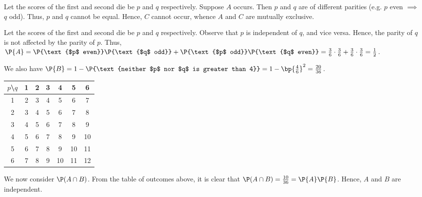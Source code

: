\begin{solution}
    \begin{ppart}
        Let the scores of the first and second die be $p$ and $q$ respectively. Suppose $A$ occurs. Then $p$ and $q$ are of different parities (e.g. $p$ even $\implies$ $q$ odd). Thus, $p$ and $q$ cannot be equal. Hence, $C$ cannot occur, whence $A$ and $C$ are mutually exclusive.
    \end{ppart}
    \begin{ppart}
        Let the scores of the first and second die be $p$ and $q$ respectively. Observe that $p$ is independent of $q$, and vice versa. Hence, the parity of $q$ is not affected by the parity of $p$. Thus, $\P{A} = \P{\text{$p$ even}}\P{\text{$q$ odd}} + \P{\text{$p$ odd}}\P{\text{$q$ even}} = \frac36 \cdot \frac36 + \frac36 \cdot \frac36 = \frac12$.

        We also have $\P{B} = 1 - \P{\text{neither $p$ nor $q$ is greater than 4}} = 1 - \bp{\frac46}^2 = \frac{20}{36}$.

        \begin{center}
            \begin{tabular}{|c|c|c|c|c|c|c|}
                \hline $p$\textbackslash$q$ & 1 & 2 & 3 & 4 & 5 & 6\\\hline
                1 & 2 & 3 & 4 & 5 & 6 & \cellcolor{blue!25}7 \\ \hline
                2 & 3 & 4 & 5 & 6 & \cellcolor{blue!25}7 & 8 \\ \hline
                3 & 4 & 5 & 6 & 7 & 8 & \cellcolor{blue!25}9 \\ \hline
                4 & 5 & 6 & 7 & 8 & \cellcolor{blue!25}9 & 10 \\ \hline
                5 & 6 & \cellcolor{blue!25}7 & 8 & \cellcolor{blue!25}9 & 10 & \cellcolor{blue!25}11 \\ \hline
                6 & \cellcolor{blue!25}7 & 8 & \cellcolor{blue!25}9 & 10 & \cellcolor{blue!25}11 & 12 \\ \hline
              \end{tabular}
        \end{center}
        
        We now consider $\P(A \cap B)$. From the table of outcomes above, it is clear that $\P(A \cap B) = \frac{10}{36} = \P{A}\P{B}$. Hence, $A$ and $B$ are independent.
    \end{ppart}
\end{solution}


